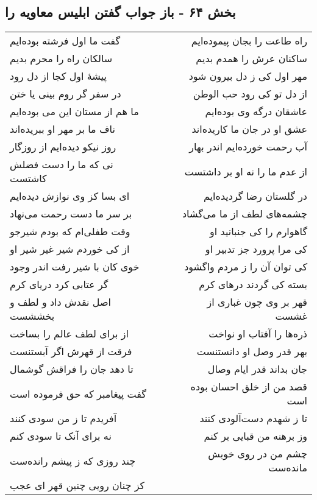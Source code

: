 \begin{center}
\section*{بخش ۶۴ - باز جواب گفتن ابلیس معاویه را}
\label{sec:sh064}
\begin{longtable}{l p{0.5cm} r}
گفت ما اول فرشته بوده‌ایم
&&
راه طاعت را بجان پیموده‌ایم
\\
سالکان راه را محرم بدیم
&&
ساکنان عرش را همدم بدیم
\\
پیشهٔ اول کجا از دل رود
&&
مهر اول کی ز دل بیرون شود
\\
در سفر گر روم بینی یا ختن
&&
از دل تو کی رود حب الوطن
\\
ما هم از مستان این می بوده‌ایم
&&
عاشقان درگه وی بوده‌ایم
\\
ناف ما بر مهر او ببریده‌اند
&&
عشق او در جان ما کاریده‌اند
\\
روز نیکو دیده‌ایم از روزگار
&&
آب رحمت خورده‌ایم اندر بهار
\\
نی که ما را دست فضلش کاشتست
&&
از عدم ما را نه او بر داشتست
\\
ای بسا کز وی نوازش دیده‌ایم
&&
در گلستان رضا گردیده‌ایم
\\
بر سر ما دست رحمت می‌نهاد
&&
چشمه‌های لطف از ما می‌گشاد
\\
وقت طفلی‌ام که بودم شیرجو
&&
گاهوارم را کی جنبانید او
\\
از کی خوردم شیر غیر شیر او
&&
کی مرا پرورد جز تدبیر او
\\
خوی کان با شیر رفت اندر وجود
&&
کی توان آن را ز مردم واگشود
\\
گر عتابی کرد دریای کرم
&&
بسته کی گردند درهای کرم
\\
اصل نقدش داد و لطف و بخششست
&&
قهر بر وی چون غباری از غشست
\\
از برای لطف عالم را بساخت
&&
ذره‌ها را آفتاب او نواخت
\\
فرقت از قهرش اگر آبستنست
&&
بهر قدر وصل او دانستنست
\\
تا دهد جان را فراقش گوشمال
&&
جان بداند قدر ایام وصال
\\
گفت پیغامبر که حق فرموده است
&&
قصد من از خلق احسان بوده است
\\
آفریدم تا ز من سودی کنند
&&
تا ز شهدم دست‌آلودی کنند
\\
نه برای آنک تا سودی کنم
&&
وز برهنه من قبایی بر کنم
\\
چند روزی که ز پیشم رانده‌ست
&&
چشم من در روی خوبش مانده‌ست
\\
کز چنان رویی چنین قهر ای عجب

\end{longtable}
\end{center}
